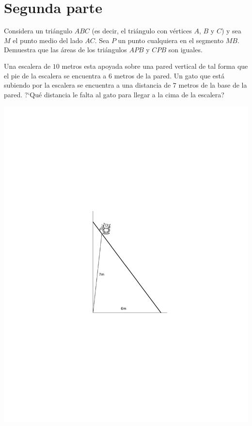 \begin{Solucion}
  
\end{Solucion}

\section{Segunda parte}
\label{sec:segunda-parte}

\begin{Problema}{11}
  Considera un tri\'angulo $ABC$ (es decir, el tri\'angulo con
  v\'ertices $A$, $B$ y $C$) y sea $M$ el punto medio del lado
  $AC$. Sea $P$ un punto cualquiera en el segmento $MB$. Demuestra que
  las \'areas de los tri\'angulos $APB$ y $CPB$ son iguales.
\end{Problema}

\begin{Solucion}
  
\end{Solucion}

\begin{Problema}{12}
  Una escalera de $10$ metros esta apoyada sobre una pared vertical de
  tal forma que el pie de la escalera se encuentra a $6$ metros de la
  pared. Un gato que est\'a subiendo por la escalera se encuentra a
  una distancia de $7$ metros de la base de la pared. ?`Qu\'e
  distancia le falta al gato para llegar a la cima de la escalera?

  \begin{center}
    \includegraphics[scale=0.7,viewport=203 273 409 529]{gato.pdf}
  \end{center}
\end{Problema}

